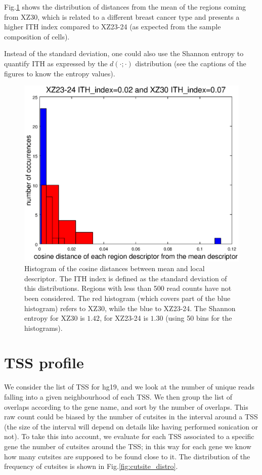 \documentclass[11pt,a4paper]{article}
\begin{document}
Fig.\ref{fig:histo_xz30} shows the distribution of distances from the mean of the regions coming from XZ30, which is related to a different breast cancer type and presents a higher ITH index compared to XZ23-24 (as expected from the sample composition of cells).

Instead of the standard deviation, one could also use the Shannon entropy to quantify ITH as expressed by the $d(\cdot;\cdot)$ distribution (see the captions of the figures to know the entropy values). 

\begin{figure}
\centering
\includegraphics[scale=0.5]{histo_xz2324VSxz30.eps}
\caption{Histogram of the cosine distances between mean and local descriptor. The ITH index is defined as the standard deviation of this distributions. Regions with less than 500 read counts have not been considered. The red histogram (which covers part of the blue histogram) refers to XZ30, while the blue to XZ23-24. The Shannon entropy for XZ30 is $1.42$, for XZ23-24 is $1.30$ (using 50 bins for the histograms).}
\label{fig:histo_xz30}
\end{figure}

\section{TSS profile}
We consider the list of TSS for hg19, and we look at the number of unique reads 
falling into a given neighbourhood of each TSS. We then group the list of 
overlaps according to the gene name, and sort by the number of overlaps. This raw count could be biased by the number of cutsites in the interval 
around a TSS (the size of the interval will depend on details like having performed sonication or not). To take this into account, we evaluate for each TSS associated to a specific gene the number of cutsites around the TSS; in this way 
for each gene we know how many cutsites are supposed to be found close to it. The distribution of the frequency of cutsites is shown in Fig.\ref{fig:cutsite_distro}.
\end{document}
